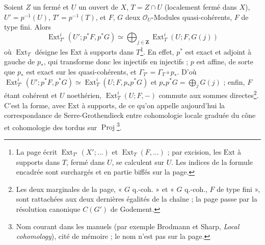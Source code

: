 \documentclass[11pt,a4paper]{article}
\begin{document}
Soient $Z$ un fermé et $U$ un ouvert de $X$, $T = Z \cap U$ (localement fermé
dans $X$), $U' = p^{-1}(U)$, $T' = p^{-1}(T)$, et $F$, $G$ deux
$\mathcal{O}_U$-Modules quasi-cohérents, $F$ de type fini. Alors
\[
  \boxed{\ \operatorname{Ext}^i_{T'}(U'; p^{*}F, p^{*}G) \simeq
  \bigoplus_{j \in \mathbf{Z}} \operatorname{Ext}^i_{T}(U; F, G(j))\ }
\]
où $\operatorname{Ext}_T$ désigne les $\mathrm{Ext}$ à supports dans
$T$\footnote{La page écrit $\operatorname{Ext}_{T'}(X'; \ldots)$ et
$\operatorname{Ext}_T(F, \ldots)$ ; par excision, les $\mathrm{Ext}$ à supports
dans $T$, fermé dans $U$, se calculent sur $U$. Les indices de la formule
encadrée sont surchargés et en partie biffés sur la page.}. En effet, $p^{*}$
est exact et adjoint à gauche de $p_{*}$, qui transforme donc les injectifs en
injectifs ; $p$ est affine, de sorte que $p_{*}$ est exact sur les
quasi-cohérents, et $\Gamma_{T'} = \Gamma_T \circ p_{*}$. D'où
$\operatorname{Ext}^i_{T'}(U'; p^{*}F, p^{*}G) \simeq
\operatorname{Ext}^i_T(U; F, p_{*}p^{*}G)$ et
$p_{*}p^{*}G = \bigoplus_j G(j)$ ; enfin, $F$ étant cohérent et $U$
noethérien, $\operatorname{Ext}^i_T(U; F, -)$ commute aux sommes
directes\footnote{Les deux marginales de la page, « $G$ q.-coh. » et « $G$
q.-coh., $F$ de type fini », sont rattachées aux deux dernières égalités de la
chaîne ; la page passe par la résolution canonique $C(G')$ de Godement.}.
C'est la forme, avec $\mathrm{Ext}$ à supports, de ce qu'on appelle aujourd'hui
la correspondance de Serre-Grothendieck entre cohomologie locale graduée du
cône et cohomologie des tordus sur $\operatorname{Proj}$\footnote{Nom courant
dans les manuels (par exemple Brodmann et Sharp, \emph{Local cohomology}),
cité de mémoire ; le nom n'est pas sur la page.}.
\end{document}
